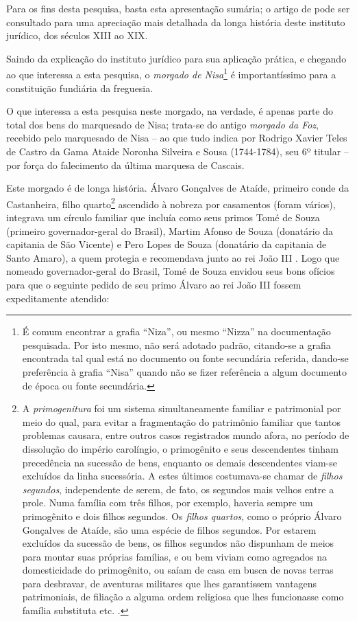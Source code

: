 Para os fins desta pesquisa, basta esta apresentação sumária; o artigo de  pode ser consultado para uma apreciação mais detalhada da longa história deste instituto jurídico, dos séculos XIII ao XIX. 

Saindo da explicação do instituto jurídico para sua aplicação prática, e chegando ao que interessa a esta pesquisa, o \textit{morgado de Nisa}\footnote{É comum encontrar a grafia ``Niza'', ou mesmo ``Nizza'' na documentação pesquisada. Por isto mesmo, não será adotado padrão, citando-se a grafia encontrada tal qual está no documento ou fonte secundária referida, dando-se preferência à grafia ``Nisa'' quando não se fizer referência a algum documento de época ou fonte secundária.} é importantíssimo para a constituição fundiária da freguesia. 

O que interessa a esta pesquisa neste morgado, na verdade, é apenas parte do total dos bens do marquesado de Nisa; trata-se do antigo \textit{morgado da Foz}, recebido pelo marquesado de Nisa -- ao que tudo indica por Rodrigo Xavier Teles de Castro da Gama Ataide Noronha Silveira e Sousa (1744-1784), seu 6º titular \cite{wiki_nisa_2015} -- por força do falecimento da última marquesa de Cascais. 

Este morgado é de longa história. Álvaro Gonçalves de Ataíde, primeiro conde da Castanheira, filho quarto\footnote{A \textit{primogenitura} foi um sistema simultaneamente familiar e patrimonial por meio do qual, para evitar a fragmentação do patrimônio familiar que tantos problemas causara, entre outros casos registrados mundo afora, no período de dissolução do império carolíngio, o primogênito e seus descendentes tinham precedência na sucessão de bens, enquanto os demais descendentes viam-se excluídos da linha sucessória. A estes últimos costumava-se chamar de \textit{filhos segundos}, independente de serem, de fato, os segundos mais velhos entre a prole. Numa família com três filhos, por exemplo, haveria sempre um primogênito e dois filhos segundos. Os \textit{filhos quartos}, como o próprio Álvaro Gonçalves de Ataíde, são uma espécie de filhos segundos. Por estarem excluídos da sucessão de bens, os filhos segundos não dispunham de meios para montar suas próprias famílias, e ou bem viviam como agregados na domesticidade do primogênito, ou saíam de casa em busca de novas terras para desbravar, de aventuras militares que lhes garantissem vantagens patrimoniais, de filiação a alguma ordem religiosa que lhes funcionasse como família substituta etc. \cite{BERNARDO1997,coelho_vincular_1980} . } ascendido à nobreza por casamentos (foram vários), integrava um círculo familiar que incluía como seus primos Tomé de Souza (primeiro governador-geral do Brasil), Martim Afonso de Souza (donatário da capitania de São Vicente) e Pero Lopes de Souza (donatário da capitania de Santo Amaro), a quem protegia e recomendava junto ao rei João III \cite[p.~III-3]{teixeira_doacoes_1978}. Logo que nomeado governador-geral do Brasil, Tomé de Souza envidou seus bons ofícios para que o seguinte pedido de seu primo Álvaro ao rei João III fossem expeditamente atendido:

